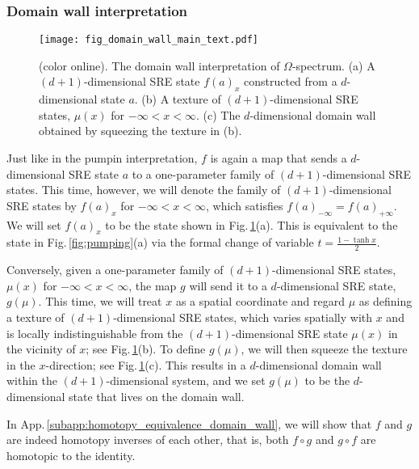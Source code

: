 \documentclass[sort&compress]{elsarticle}
\theoremstyle{theoremstyle}
\theoremstyle{framedtheoremstyle}
\theoremstyle{definitionstyle}
\theoremstyle{definitionstyle}
\theoremstyle{definitionstyle}
\theoremstyle{definitionstyle}
\theoremstyle{nameddefinitionstyle}
\theoremstyle{framednameddefinitionstyle}
\theoremstyle{proofstyle}
\theoremstyle{definitionstyle}
\begin{document}
\subsubsection{Domain wall interpretation\label{subsubsec:domain_wall}}

\begin{figure}
\centering
\texttt{[image: fig\_domain\_wall\_main\_text.pdf]}
\caption{(color online). The domain wall interpretation of $\Omega$-spectrum. (a) A $(d+1)$-dimensional SRE state $f(a)_x$ constructed from a $d$-dimensional state $a$. (b) A texture of $(d+1)$-dimensional SRE states, $\mu(x)$ for $-\infty < x < \infty$. (c) The $d$-dimensional domain wall obtained by squeezing the texture in (b).}
\label{fig:domain_wall}
\end{figure}

Just like in the pumpin interpretation, $f$ is again a map that sends a $d$-dimensional SRE state $a$ to a one-parameter family of $(d+1)$-dimensional SRE states. This time, however, we will denote the family of $(d+1)$-dimensional SRE states by $f(a)_x$ for $-\infty < x < \infty$, which satisfies $f(a)_{-\infty} = f(a)_{+\infty}$. We will set $f(a)_x$ to be the state shown in Fig.\,\ref{fig:domain_wall}(a). This is equivalent to the state in Fig.\,\ref{fig:pumping}(a) via the formal change of variable $t = \frac{1 - \tanh x}{2}$.

Conversely, given a one-parameter family of $(d+1)$-dimensional SRE states, $\mu(x)$ for $-\infty < x < \infty$, the map $g$ will send it to a $d$-dimensional SRE state, $g(\mu)$. This time, we will treat $x$ as a spatial coordinate and regard $\mu$ as defining a texture of $(d+1)$-dimensional SRE states, which varies spatially with $x$ and is locally indistinguishable from the $(d+1)$-dimensional SRE state $\mu(x)$ in the vicinity of $x$; see Fig.\,\ref{fig:domain_wall}(b). To define $g(\mu)$, we will then squeeze the texture in the $x$-direction; see Fig.\,\ref{fig:domain_wall}(c). This results in a $d$-dimensional domain wall within the $(d+1)$-dimensional system, and we set $g(\mu)$ to be the $d$-dimensional state that lives on the domain wall.

In App.\,\ref{subapp:homotopy_equivalence_domain_wall}, we will show that $f$ and $g$ are indeed homotopy inverses of each other, that is, both $f\circ g$ and $g \circ f$ are homotopic to the identity.
\end{document}

